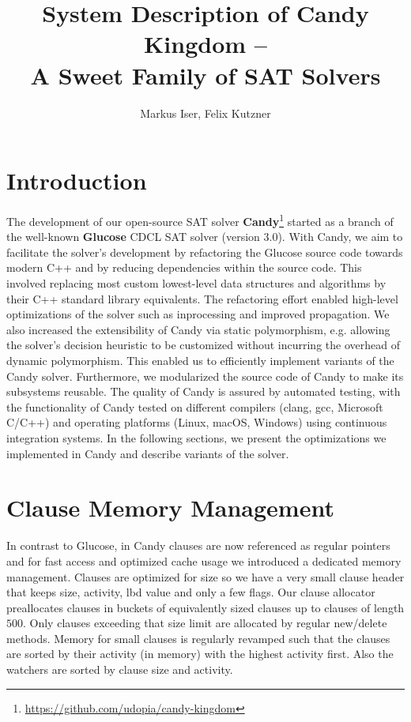 \documentclass[conference]{IEEEtran}
\title{System Description of Candy Kingdom --\\ A Sweet Family of SAT Solvers}
\author{Markus Iser, Felix Kutzner}
\begin{document}
\maketitle

\begin{abstract}

\end{abstract}

\section{Introduction}

The development of our open-source SAT solver \textbf{Candy}\footnote{\url{https://github.com/udopia/candy-kingdom}} started as a branch of the well-known \textbf{Glucose} \cite{Audemard:2009:Glucose} CDCL SAT solver (version 3.0).
With Candy, we aim to facilitate the solver's development by refactoring the Glucose source code towards modern C++ and by reducing dependencies within the source code.
This involved replacing most custom lowest-level data structures and algorithms by their C++ standard library equivalents.
The refactoring effort enabled high-level optimizations of the solver such as inprocessing and improved propagation.
We also increased the extensibility of Candy via static polymorphism, e.g. allowing the solver's decision heuristic to be customized without incurring the overhead of dynamic polymorphism. This enabled us to efficiently implement variants of the Candy solver.
Furthermore, we modularized the source code of Candy to make its subsystems reusable.
The quality of Candy is assured by automated testing, with the functionality of Candy tested on different compilers (clang, gcc, Microsoft C/C++) and operating platforms (Linux, macOS, Windows) using continuous integration systems.
In the following sections, we present the optimizations we implemented in Candy and describe variants of the solver.

\section{Clause Memory Management}
\label{sec:clauses}

In contrast to Glucose, in Candy clauses are now referenced as regular pointers and for fast access and optimized cache usage we introduced a dedicated memory management. Clauses are optimized for size so we have a very small clause header that keeps size, activity, lbd value and only a few flags. Our clause allocator preallocates clauses in buckets of equivalently sized clauses up to clauses of length $500$. Only clauses exceeding that size limit are allocated by regular new/delete methods. Memory for small clauses is regularly revamped such that the clauses are sorted by their activity (in memory) with the highest activity first. Also the watchers are sorted by clause size and activity. 
\end{document}
